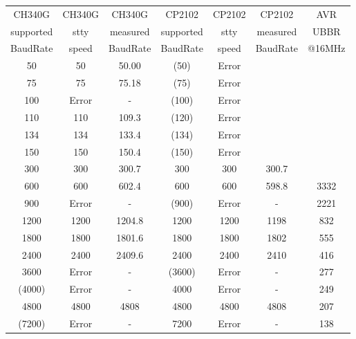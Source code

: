 \begin{table}[H]
  \begin{center}
    \begin{tabular}{| c | c | c || c | c | c || c |}
    \hline
    CH340G     & CH340G & CH340G   &  CP2102   & CP2102 & CP2102    & AVR \\
    supported  & stty  & measured  & supported & stty   & measured  & UBBR  \\
    BaudRate   & speed & BaudRate  & BaudRate  & speed  & BaudRate  & @16MHz \\
    \hline
    \hline
         50    & 50    &   50.00   &   (50)    & Error  &           &       \\
    \hline
         75    & 75    &   75.18   &   (75)    & Error  &           &        \\
    \hline
        100    & Error &    -      &  (100)    & Error  &           &        \\
    \hline
        110    & 110   &   109.3   &  (120)    & Error  &           &        \\
    \hline
        134    & 134   &   133.4   &  (134)    & Error  &           &       \\
    \hline
        150    & 150   &   150.4   &  (150)    & Error  &           &        \\
    \hline
        300    & 300   &   300.7   &   300     &  300   &   300.7    &       \\
    \hline
        600    & 600   &   602.4   &   600     &  600   &   598.8   &  3332  \\
    \hline
        900    & Error &    -      &  (900)    &  Error &    -      &  2221 \\
    \hline
       1200    & 1200  &   1204.8  &   1200    &  1200  &   1198    &   832  \\
    \hline
       1800    & 1800  &   1801.6  &   1800    &  1800  &   1802    &   555 \\
    \hline
       2400    & 2400  &   2409.6  &   2400    &  2400  &   2410    &   416  \\
    \hline
       3600    & Error &   -       &  (3600)   &  Error &    -      &   277  \\
    \hline
      (4000)   & Error &   -       &   4000    &  Error &    -      &   249  \\
    \hline
       4800    & 4800  &   4808    &   4800    &  4800  &   4808    &   207  \\
    \hline
      (7200)   & Error &   -       &   7200    &  Error &    -      &   138  \\

\end{tabular}
\end{center}
\end{table}
